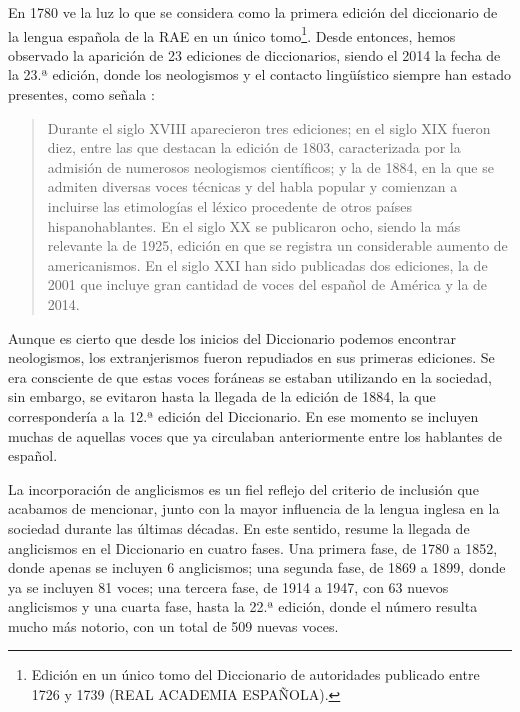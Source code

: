 \documentclass{textolivre}
\begin{document}
En 1780 ve la luz lo que se considera como la primera edición del diccionario de la lengua española de la RAE en un único tomo\footnote{
Edición en un único tomo del Diccionario de autoridades publicado entre 1726 y 1739 (REAL ACADEMIA ESPAÑOLA).
}. Desde entonces, hemos observado la aparición de 23 ediciones de diccionarios, siendo el 2014 la fecha de la 23.ª edición, donde los neologismos y el contacto lingüístico siempre han estado presentes, como señala \textcite[p. 276]{amador2015}:

\begin{quote}
Durante el siglo XVIII aparecieron tres ediciones; en el siglo XIX fueron diez, entre las que destacan la edición de 1803, caracterizada por la admisión de numerosos neologismos científicos; y la de 1884, en la que se admiten diversas voces técnicas y del habla popular y comienzan a incluirse las etimologías el léxico procedente de otros países hispanohablantes. En el siglo XX se publicaron ocho, siendo la más relevante la de 1925, edición en que se registra un considerable aumento de americanismos. En el siglo XXI han sido publicadas dos ediciones, la de 2001 que incluye gran cantidad de voces del español de América y la de 2014.
\end{quote}

Aunque es cierto que desde los inicios del Diccionario podemos encontrar neologismos, los extranjerismos fueron repudiados en sus primeras ediciones. Se era consciente de que estas voces foráneas se estaban utilizando en la sociedad, sin embargo, se evitaron hasta la llegada de la edición de 1884, la que correspondería a la 12.ª edición del Diccionario. En ese momento se incluyen muchas de aquellas voces que ya circulaban anteriormente entre los hablantes de español.

La incorporación de anglicismos es un fiel reflejo del criterio de inclusión que acabamos de mencionar, junto con la mayor influencia de la lengua inglesa en la sociedad durante las últimas décadas. En este sentido, \textcite{pedrero2007} resume la llegada de anglicismos en el Diccionario en cuatro fases. Una primera fase, de 1780 a 1852, donde apenas se incluyen 6 anglicismos; una segunda fase, de 1869 a 1899, donde ya se incluyen 81 voces; una tercera fase, de 1914 a 1947, con 63 nuevos anglicismos y una cuarta fase, hasta la 22.ª edición, donde el número resulta mucho más notorio, con un total de 509 nuevas voces.
\end{document}
